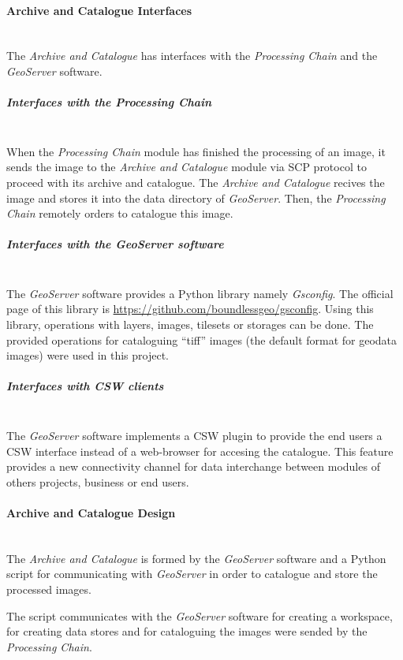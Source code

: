 \paragraph{Archive and Catalogue Interfaces}~\\

The \emph{Archive and Catalogue} has interfaces with the \emph{Processing Chain}
and the \emph{GeoServer} software. 

\subparagraph{Interfaces with the Processing Chain}~\\

When the \emph{Processing Chain} module has finished the processing of an image,
it sends the image to the \emph{Archive and Catalogue} module via \ac{SCP} protocol to proceed with its archive and catalogue. The
\emph{Archive and Catalogue} recives the image and stores it into the data
directory of \emph{GeoServer}. Then, the \emph{Processing Chain} remotely orders
to catalogue this image.  

\subparagraph{Interfaces with the GeoServer software}~\\

The \emph{GeoServer} software provides a Python library namely
\emph{Gsconfig}. The official page of this library is
\url{https://github.com/boundlessgeo/gsconfig}. Using this library, operations
with layers, images, tilesets or storages can be done. The provided operations
for cataloguing ``tiff'' images (the default format for geodata images) were used in this project.

\subparagraph{Interfaces with CSW clients}~\\

The \emph{GeoServer} software implements a \ac{CSW} plugin to provide the end users
a \ac{CSW} interface instead of a web-browser for accesing the catalogue.
This feature provides a new connectivity channel for data interchange between
modules of others projects, business or end users.

\paragraph{Archive and Catalogue Design}~\\

The \emph{Archive and Catalogue} is formed by the \emph{GeoServer} software and
a Python script for communicating with \emph{GeoServer} in order to catalogue
and store the processed images.

The script communicates with the \emph{GeoServer} software for creating a
workspace, for creating data stores and for cataloguing the images were sended
by the \emph{Processing Chain}. 


